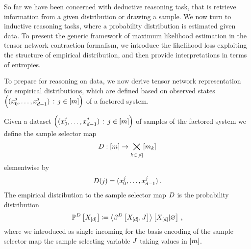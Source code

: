 
So far we have been concerned with deductive reasoning task, that is retrieve information from a given distribution or drawing a sample.
We now turn to inductive reasoning tasks, where a probability distribution is estimated given data.
To present the generic framework of maximum likelihood estimation in the tensor network contraction formalism, we introduce the likelihood loss exploiting the structure of empirical distribution, and then provide interpretations in terms of entropies.

\label{sec:empDistribution}

To prepare for reasoning on data, we now derive tensor network representation for empirical distributions, which are defined based on observed states $\left(({x_{0}^{j},\ldots,x_{d-1}^{j}})\,:\,j\in[m]\right)$ of a factored system.

\begin{definition}
    \label{def:dataMap}
    Given a dataset $\left(({x_{0}^{j},\ldots,x_{d-1}^{j}})\,:\,j\in[m]\right)$ of samples of the factored system we define the sample selector map
    \begin{align*}
        D : [m] \rightarrow \bigtimes_{k\in[d]}[m_{k}]
    \end{align*}
    elementwise by
    \begin{align*}
        D(j) = ({x_{0}^{j},\ldots,x_{d-1}^{j}}) \, .
    \end{align*}
    The empirical distribution to the sample selector map $D$ is the probability distribution
    \begin{align*}
        \mathbb{P}^{D}\left[X_{[d]}\right]
        \coloneqq \left\langle \beta^{D}\left[X_{[d]},J\right]\right\rangle \left[ X_{[d]} | \varnothing \right] \, ,
    \end{align*}
    where we introduced as single incoming for the basis encoding of the sample selector map the sample selecting variable $J$ taking values in $[m]$.
\end{definition}

